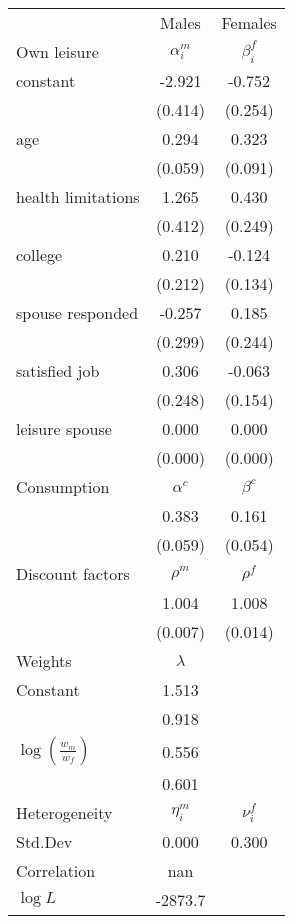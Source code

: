 \begin{tabular}{lcc} 
\hline\hline 
 & Males & Females \\ 
Own leisure & $\alpha_{i}^{m}$ & $\beta_{i}^{f}$ \\ 
constant & -2.921 & -0.752 \\ 
 & (0.414) & (0.254) \\ 
age & 0.294 & 0.323 \\ 
 & (0.059) & (0.091) \\ 
health limitations & 1.265 & 0.430 \\ 
 & (0.412) & (0.249) \\ 
college & 0.210 & -0.124 \\ 
 & (0.212) & (0.134) \\ 
spouse responded & -0.257 & 0.185 \\ 
 & (0.299) & (0.244) \\ 
satisfied job & 0.306 & -0.063 \\ 
 & (0.248) & (0.154) \\ 
leisure spouse & 0.000 & 0.000 \\ 
 & (0.000) & (0.000) \\ 
Consumption & $\alpha^{c}$ & $\beta^{c}$ \\ 
 & 0.383 & 0.161 \\ 
 & (0.059) & (0.054) \\ 
Discount factors & $\rho^m$ & $\rho^f$ \\ 
 & 1.004 & 1.008 \\ 
 & (0.007) & (0.014) \\ 
Weights & $\lambda$ &  \\ 
Constant & 1.513 &  \\ 
 & 0.918 &  \\ 
$\log(\frac{w_m}{w_f})$ & 0.556 &  \\ 
 & 0.601 &  \\ 
Heterogeneity & $\eta_i^m$ & $\nu_i^f$ \\ 
Std.Dev & 0.000 & 0.300 \\ 
Correlation & nan &  \\ 
\hline 
$\log L$ & -2873.7 & \\ 
\hline \hline 
\end{tabular} 
